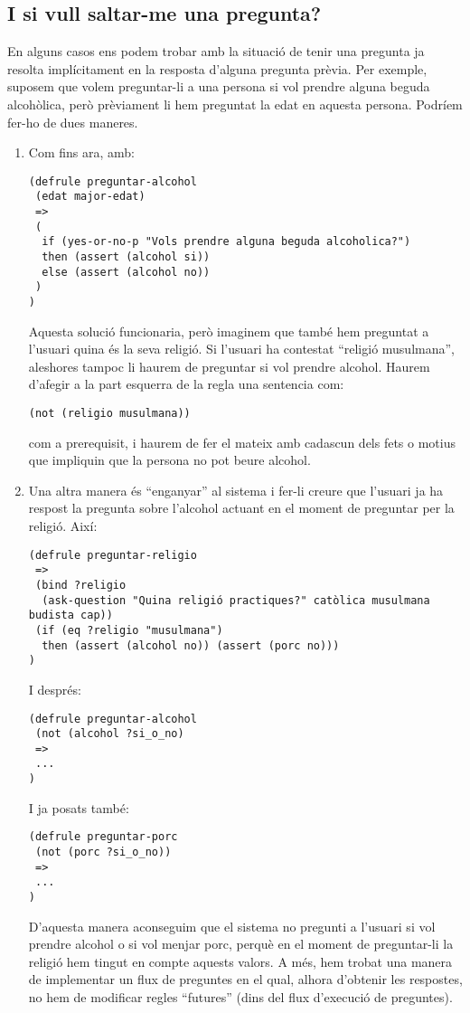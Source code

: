 \documentclass[11pt,svgnames]{scrbook}
\begin{document}
\subsection{I si vull saltar-me una pregunta?}


En alguns casos ens podem trobar amb la situació de tenir una pregunta ja resolta implícitament en la resposta d'alguna pregunta prèvia. Per exemple, suposem que volem preguntar-li a una persona si vol prendre alguna beguda alcohòlica, però prèviament li hem preguntat la edat en aquesta persona. Podríem fer-ho de dues maneres.
\begin{enumerate}
 \item Com fins ara, amb:

\begin{verbatim}
(defrule preguntar-alcohol
 (edat major-edat)
 =>
 (
  if (yes-or-no-p "Vols prendre alguna beguda alcoholica?")
  then (assert (alcohol si))
  else (assert (alcohol no))
 )
)
\end{verbatim}
Aquesta solució funcionaria, però imaginem que també hem preguntat a l'usuari quina és la seva religió. Si l'usuari ha contestat ``religió musulmana'', aleshores tampoc li haurem de preguntar si vol prendre alcohol. Haurem d'afegir a la part esquerra de la regla una sentencia com:

 \texttt{(not (religio musulmana))}

com a prerequisit, i haurem de fer el mateix amb cadascun dels fets o motius que impliquin que la persona no pot beure alcohol.

\item Una altra manera és ``enganyar'' al sistema i fer-li creure que l'usuari ja ha respost la pregunta sobre l'alcohol actuant en el moment de preguntar per la religió. Així:


\begin{verbatim}
(defrule preguntar-religio
 =>
 (bind ?religio 
  (ask-question "Quina religió practiques?" catòlica musulmana budista cap))
 (if (eq ?religio "musulmana")
  then (assert (alcohol no)) (assert (porc no)))
)\end{verbatim}

I després:

\begin{verbatim}
(defrule preguntar-alcohol
 (not (alcohol ?si_o_no)
 =>
 ...
)\end{verbatim}

I ja posats també:

\begin{verbatim}
(defrule preguntar-porc
 (not (porc ?si_o_no))
 =>
 ...
)\end{verbatim}

D'aquesta manera aconseguim que el sistema no pregunti a l'usuari si vol prendre alcohol o si vol menjar porc, perquè en el moment de preguntar-li la religió hem tingut en compte aquests valors. A més, hem trobat una manera de implementar un flux de preguntes en el qual, alhora d'obtenir les respostes, no hem de modificar regles ``futures'' (dins del flux d'execució de preguntes).

\end{enumerate}
\end{document}
